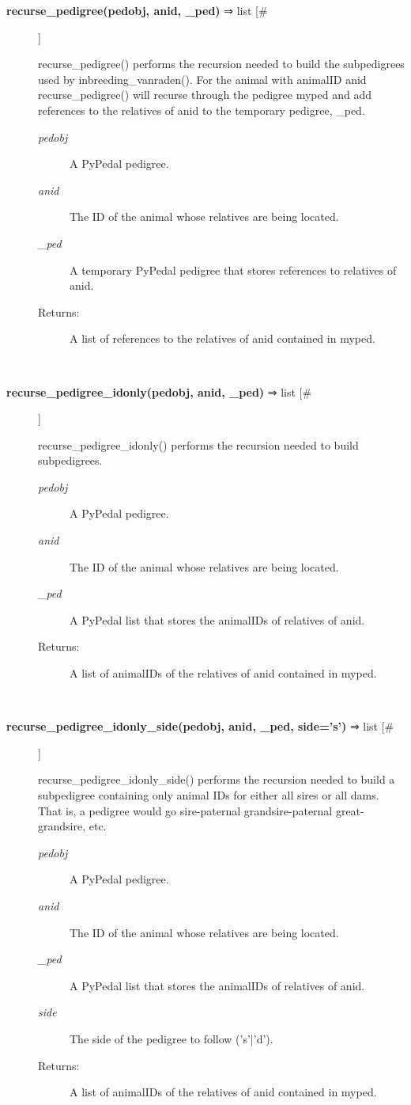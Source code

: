 \documentclass{article}
\begin{document}
\begin{description}
\item[\textbf{recurse\_pedigree(pedobj, anid, \_ped)} ⇒ list [\#]
]
\par recurse\_pedigree() performs the recursion needed to build the subpedigrees used by
inbreeding\_vanraden().  For the animal with animalID anid recurse\_pedigree() will
recurse through the pedigree myped and add references to the relatives of anid to
the temporary pedigree, \_ped.
\begin{description}
\item[\textit{pedobj}
]
A PyPedal pedigree.
\item[\textit{anid}
]
The ID of the animal whose relatives are being located.
\item[\textit{\_ped}
]
A temporary PyPedal pedigree that stores references to relatives of anid.
\item[Returns:
]
A list of references to the relatives of anid contained in myped.
\end{description}\\

\item[\textbf{recurse\_pedigree\_idonly(pedobj, anid, \_ped)} ⇒ list [\#]
]
\par recurse\_pedigree\_idonly() performs the recursion needed to build subpedigrees.
\begin{description}
\item[\textit{pedobj}
]
A PyPedal pedigree.
\item[\textit{anid}
]
The ID of the animal whose relatives are being located.
\item[\textit{\_ped}
]
A PyPedal list that stores the animalIDs of relatives of anid.
\item[Returns:
]
A list of animalIDs of the relatives of anid contained in myped.
\end{description}\\

\item[\textbf{recurse\_pedigree\_idonly\_side(pedobj, anid, \_ped, side='s')} ⇒ list [\#]
]
\par recurse\_pedigree\_idonly\_side() performs the recursion needed to build
a subpedigree containing only animal IDs for either all sires or all
dams.  That is, a pedigree would go sire-paternal grandsire-paternal
great-grandsire, etc.
\begin{description}
\item[\textit{pedobj}
]
A PyPedal pedigree.
\item[\textit{anid}
]
The ID of the animal whose relatives are being located.
\item[\textit{\_ped}
]
A PyPedal list that stores the animalIDs of relatives of anid.
\item[\textit{side}
]
The side of the pedigree to follow ('s'|'d').
\item[Returns:
]
A list of animalIDs of the relatives of anid contained in myped.
\end{description}\\


\end{description}
\end{document}
